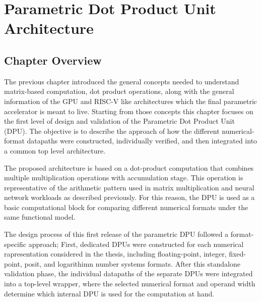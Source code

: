 
\chapter{Parametric Dot Product Unit Architecture}
\label{ch:parametric_dpu}



\section{Chapter Overview}

The previous chapter introduced the general concepts needed to understand matrix-based computation, dot product operations, along with the general information of the GPU and RISC-V like architectures which the final parametric accelerator is meant to live. Starting from those concepts this chapter focuses on the first level of design and validation of the Parametric Dot Product Unit (DPU). The objective is to describe the approach of how the different numerical-format datapaths were constructed, individually verified, and then integrated into a common top level architecture.

The proposed architecture is based on a dot-product computation that combines multiple multiplication operations with accumulation stage. This operation is representative of the arithmetic pattern used in matrix multiplication and neural network workloads as described previously. For this reason, the DPU is used as a basic computational block for comparing different numerical formats under the same functional model. 

The design process of this first release of the parametric DPU followed a format-specific approach; First, dedicated DPUs were constructed for each numerical rapresentation considered in the thesis, including floating-point, integer, fixed-point, posit, and logarithimn number systems formats. After this standalone validation phase, the individual datapaths of the separate DPUs were integrated into a top-level wrapper, where the selected numerical format and operand width determine which internal DPU is used for the computation at hand.

